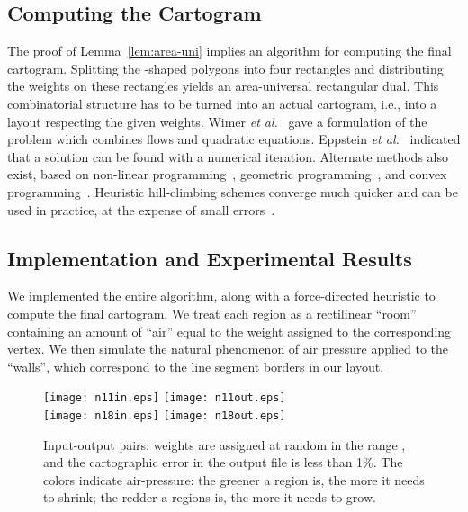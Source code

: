 \documentclass[11pt]{article}
\begin{document}
\subsection{Computing the Cartogram}

The proof of Lemma~\ref{lem:area-uni} implies an algorithm for computing the final cartogram. Splitting the -shaped polygons
 into four rectangles and distributing the weights on these rectangles yields an
area-universal rectangular dual.  This combinatorial structure has to be
turned into an actual cartogram, i.e., into a layout respecting the given
weights.
Wimer \textit{et al.}~\cite{WKC} gave a formulation of the problem
which combines flows and quadratic equations.  Eppstein \textit{et al.}~\cite{EMVS} indicated that a solution can be
 found with a numerical iteration.  Alternate methods also exist, based on non-linear programming~\cite{rosenberg},
 geometric programming~\cite{MCH96}, and convex programming~\cite{ChenFan98}. Heuristic hill-climbing schemes converge
 much quicker and can be used in practice, at the expense of small errors~\cite{Ceder92,ITK98,WC95}.


\subsection{Implementation and Experimental Results}

We implemented the entire algorithm, along with a force-directed heuristic to compute the final cartogram.
We treat each region as a rectilinear ``room'' containing an amount of ``air'' equal to the weight assigned to the corresponding vertex. We then simulate the natural phenomenon
 of air pressure applied to the ``walls'', which correspond to the line segment borders in our layout.

\begin{figure}[htbp]
\centering
\texttt{[image: n11in.eps]}\hspace{.4cm}
\texttt{[image: n11out.eps]}\\
\vspace{.5cm}
\texttt{[image: n18in.eps]}\hspace{.4cm}
\texttt{[image: n18out.eps]}
\caption{\small\sf Input-output pairs: weights are assigned at random in the range , and the cartographic error in the output file is less than 1\%. The colors indicate air-pressure: the greener a region is, the more it needs to shrink; the redder a regions is, the more it needs to grow.}
\label{fig:examples}
\end{figure}
\end{document}
